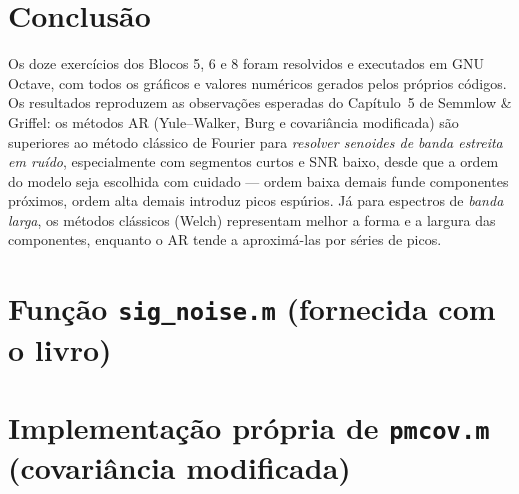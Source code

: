 \documentclass[11pt,a4paper]{article}
\begin{document}
\section{Conclus\~ao}

Os doze exerc\'icios dos Blocos 5, 6 e 8 foram resolvidos e executados em GNU Octave,
com todos os gr\'aficos e valores num\'ericos gerados pelos pr\'oprios c\'odigos.
Os resultados reproduzem as observa\c{c}\~oes esperadas do Cap\'itulo~5 de Semmlow
\& Griffel: os m\'etodos AR (Yule--Walker, Burg e covari\^ancia modificada) s\~ao
superiores ao m\'etodo cl\'assico de Fourier para \emph{resolver senoides de banda
estreita em ru\'ido}, especialmente com segmentos curtos e SNR baixo, desde que a
ordem do modelo seja escolhida com cuidado --- ordem baixa demais funde componentes
pr\'oximos, ordem alta demais introduz picos esp\'urios. J\'a para espectros de
\emph{banda larga}, os m\'etodos cl\'assicos (Welch) representam melhor a forma e a
largura das componentes, enquanto o AR tende a aproxim\'a-las por s\'eries de picos.

\appendix
\section{Fun\c{c}\~ao \texttt{sig\_noise.m} (fornecida com o livro)}
\label{ap:signoise}


\section{Implementa\c{c}\~ao pr\'opria de \texttt{pmcov.m} (covari\^ancia modificada)}
\label{ap:pmcov}

\end{document}

